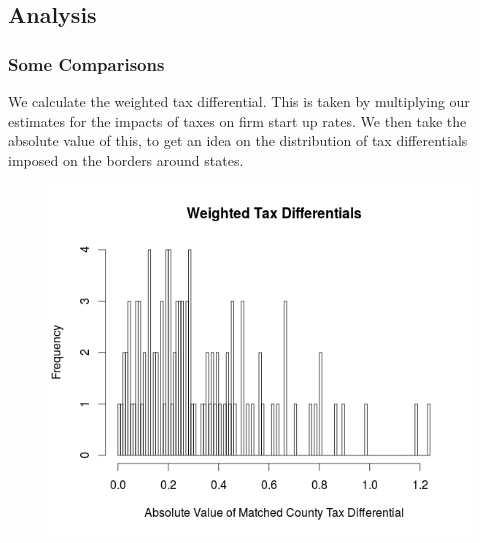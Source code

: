 \documentclass{beamer}
\begin{document}
\begin{frame}
\section{Analysis}
\frametitle{Some Comparisons}
We calculate the weighted tax differential. This is taken by multiplying our estimates for the impacts of taxes on firm start up rates. We then take the absolute value of this, to get an idea on the distribution of tax differentials imposed on the borders around states.
\begin{figure}
\centering
\includegraphics[scale=0.35]{taxdiff}
\end{figure}
\end{frame}
\end{document}
